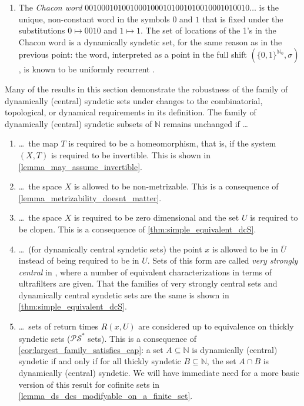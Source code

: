 \documentclass[letter,11pt]{article}
\theoremstyle{plain}
\theoremstyle{definition}
\theoremstyle{plain}
\theoremstyle{plain}
\numberwithin{equation}{section}
\newcommand{\N}{\mathbb{N}}
\newcommand{\PS}{\mathcal{PS}}
\begin{document}
\begin{enumerate}
    \item The \emph{Chacon word} $0010001010010 0010001010010 1 0010001010010\ldots$ is the unique, non-constant word in the symbols $0$ and $1$ that is fixed under the substitutions $0 \mapsto 0010$ and $1 \mapsto 1$.  The set of locations of the 1's in the Chacon word is a dynamically syndetic set, for the same reason as in the previous point: the word, interpreted as a point in the full shift $(\{0,1\}^{\N_0},\sigma)$, is known to be uniformly recurrent \cite[Sec. 5.6.6]{devries_2014}.\\
\end{enumerate}

Many of the results in this section demonstrate the robustness of the family of dynamically (central) syndetic sets under changes to the combinatorial, topological, or dynamical requirements in its definition.  The family of dynamically (central) syndetic subsets of $\N$ remains unchanged if \dots
\begin{enumerate}
    \item \dots \ the map $T$ is required to be a homeomorphism, that is, if the system $(X,T)$ is required to be invertible.  This is shown in \cref{lemma_may_assume_invertible}.

    \item \dots \ the space $X$ is allowed to be non-metrizable. This is a consequence of \cref{lemma_metrizability_doesnt_matter}.

    \item \dots \ the space $X$ is required to be zero dimensional and the set $U$ is required to be clopen. This is a consequence of \cref{thm:simple_equivalent_dcS}.

    \item \dots \ (for dynamically central syndetic sets) the point $x$ is allowed to be in $\overline{U}$ instead of being required to be in $U$.  Sets of this form are called \emph{very strongly central} in \cite[Def. 2.10]{bergelson_hindman_strauss_2012}, where a number of equivalent characterizations in terms of ultrafilters are given.  That the families of very strongly central sets and dynamically central syndetic sets are the same is shown in \cref{thm:simple_equivalent_dcS}.

    \item \dots \ sets of return times $R(x,U)$ are considered up to equivalence on thickly syndetic sets ($\PS^*$ sets). This is a consequence of \cref{cor:largest_family_satisfies_cap}: a set $A \subseteq \N$ is dynamically (central) syndetic if and only if for all thickly syndetic $B \subseteq \N$, the set $A \cap B$ is dynamically (central) syndetic.  We will have immediate need for a more basic version of this result for cofinite sets in \cref{lemma_ds_dcs_modifyable_on_a_finite_set}.\\
\end{enumerate}
\end{document}
